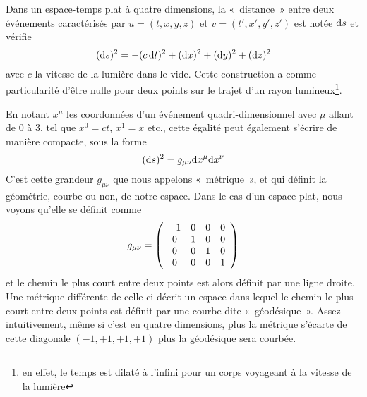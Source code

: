 \documentclass[../main/main.tex]{subfiles}
\begin{document}
Dans un espace-temps plat à quatre dimensions, la «~distance~» entre deux
événements caractérisés par $u=(t,x,y,z)$ et $v=(t',x',y',z')$ est notée $\mathrm{d} s$
et vérifie
\begin{equation}
    (\mathrm{d} s)^2 = -(c\,\mathrm{d} t)^2 + (\mathrm{d} x)^2 + (\mathrm{d} y)^2 + (\mathrm{d} z)^2
\end{equation}
avec $c$ la vitesse de la lumière dans le vide. Cette construction a comme
particularité d'être nulle pour deux points sur le trajet d'un rayon
lumineux\footnote{en effet, le temps est dilaté à l'infini pour un corps
voyageant à la vitesse de la lumière}.

En notant $x^\mu$ les coordonnées d'un événement quadri-dimensionnel avec $\mu$
allant de 0 à 3, tel que $x^0 = ct$, $x^1 = x$ etc., cette égalité peut
également s'écrire de manière compacte, sous la forme
\begin{equation}
    (\mathrm{d} s)^2 = g_{\mu\nu}\mathrm{d} x^\mu \mathrm{d} x^\nu
\end{equation}
C'est cette grandeur $g_{\mu\nu}$ que nous appelons «~métrique~», et qui définit
la géométrie, courbe ou non, de notre espace. Dans le cas d'un espace plat, nous
voyons qu'elle se définit comme
\begin{equation}
    g_{\mu\nu} = \left(\begin{array}{c c c c}
            -1 & 0 & 0 & 0\\
            0 & 1 & 0 & 0\\
            0 & 0 & 1 & 0\\
            0 & 0 & 0 & 1\\
    \end{array}\right)
\end{equation}
et le chemin le plus court entre deux points est alors définit par une ligne
droite. Une métrique différente de celle-ci décrit un espace dans lequel le
chemin le plus court entre deux points est définit par une courbe dite
«~géodésique~». Assez intuitivement, même si c'est en quatre dimensions, plus la
métrique s'écarte de cette diagonale $(-1,+1,+1,+1)$ plus la géodésique sera
courbée.
\end{document}
